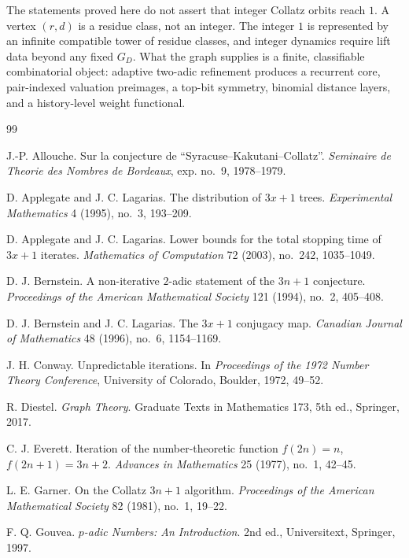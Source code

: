 \documentclass[11pt]{article}
\theoremstyle{definition}
\theoremstyle{remark}
\begin{document}
The statements proved here do not assert that integer Collatz orbits reach $1$.  A vertex $(r,d)$ is a residue class, not an integer.  The integer $1$ is represented by an infinite compatible tower of residue classes, and integer dynamics require lift data beyond any fixed $G_D$.  What the graph supplies is a finite, classifiable combinatorial object: adaptive two-adic refinement produces a recurrent core, pair-indexed valuation preimages, a top-bit symmetry, binomial distance layers, and a history-level weight functional.


\begin{thebibliography}{99}

J.-P. Allouche.
Sur la conjecture de ``Syracuse--Kakutani--Collatz''.
\emph{Seminaire de Theorie des Nombres de Bordeaux}, exp. no.~9, 1978--1979.

D. Applegate and J. C. Lagarias.
The distribution of $3x+1$ trees.
\emph{Experimental Mathematics} 4 (1995), no.~3, 193--209.

D. Applegate and J. C. Lagarias.
Lower bounds for the total stopping time of $3x+1$ iterates.
\emph{Mathematics of Computation} 72 (2003), no.~242, 1035--1049.

D. J. Bernstein.
A non-iterative $2$-adic statement of the $3n+1$ conjecture.
\emph{Proceedings of the American Mathematical Society} 121 (1994), no.~2, 405--408.

D. J. Bernstein and J. C. Lagarias.
The $3x+1$ conjugacy map.
\emph{Canadian Journal of Mathematics} 48 (1996), no.~6, 1154--1169.

J. H. Conway.
Unpredictable iterations.
In \emph{Proceedings of the 1972 Number Theory Conference}, University of Colorado, Boulder, 1972, 49--52.

R. Diestel.
\emph{Graph Theory}.
Graduate Texts in Mathematics 173, 5th ed., Springer, 2017.

C. J. Everett.
Iteration of the number-theoretic function $f(2n)=n$, $f(2n+1)=3n+2$.
\emph{Advances in Mathematics} 25 (1977), no.~1, 42--45.

L. E. Garner.
On the Collatz $3n+1$ algorithm.
\emph{Proceedings of the American Mathematical Society} 82 (1981), no.~1, 19--22.

F. Q. Gouvea.
\emph{$p$-adic Numbers: An Introduction}.
2nd ed., Universitext, Springer, 1997.


\end{thebibliography}
\end{document}
